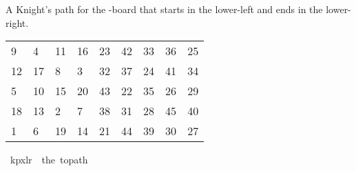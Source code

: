 \begin{isabellebody}
\begin{isamarkuptext}%
A Knight's path for the -board that starts in the lower-left and ends in the lower-right.
  \begin{table}[H]
    \begin{tabular}{lllllllll}
       9 &  4 & 11 & 16 & 23 & 42 & 33 & 36 & 25 \\
      12 & 17 &  8 &  3 & 32 & 37 & 24 & 41 & 34 \\
       5 & 10 & 15 & 20 & 43 & 22 & 35 & 26 & 29 \\
      18 & 13 &  2 &  7 & 38 & 31 & 28 & 45 & 40 \\
       1 &  6 & 19 & 14 & 21 & 44 & 39 & 30 & 27
    \end{tabular}
  \end{table}%
\end{isamarkuptext}\isamarkuptrue%
\isamarkupfalse%
\ {\isachardoublequoteopen}kp{}x{}lr\ {\isasymequiv}\ the\ {\isacharparenleft}{\kern0pt}to{\isacharunderscore}{\kern0pt}path\ \isanewline
\ \ {\isacharbrackleft}{\kern0pt}{\isacharbrackleft}{\kern0pt}{}{\isacharcomma}{\kern0pt}{}{\isacharcomma}{\kern0pt}{}{}{\isacharcomma}{\kern0pt}{}{}{\isacharcomma}{\kern0pt}{}{}{\isacharcomma}{\kern0pt}{}{}{\isacharcomma}{\kern0pt}{}{}{\isacharcomma}{\kern0pt}{}{}{\isacharcomma}{\kern0pt}{}{}{\isacharbrackright}{\kern0pt}{\isacharcomma}{\kern0pt}\isanewline
\ \ {\isacharbrackleft}{\kern0pt}{}{}{\isacharcomma}{\kern0pt}{}{}{\isacharcomma}{\kern0pt}{}{\isacharcomma}{\kern0pt}{}{\isacharcomma}{\kern0pt}{}{}{\isacharcomma}{\kern0pt}{}{}{\isacharcomma}{\kern0pt}{}{}{\isacharcomma}{\kern0pt}{}{}{\isacharcomma}{\kern0pt}{}{}{\isacharbrackright}{\kern0pt}{\isacharcomma}{\kern0pt}\isanewline
\ \ {\isacharbrackleft}{\kern0pt}{}{\isacharcomma}{\kern0pt}{}{}{\isacharcomma}{\kern0pt}{}{}{\isacharcomma}{\kern0pt}{}{}{\isacharcomma}{\kern0pt}{}{}{\isacharcomma}{\kern0pt}{}{}{\isacharcomma}{\kern0pt}{}{}{\isacharcomma}{\kern0pt}{}{}{\isacharcomma}{\kern0pt}{}{}{\isacharbrackright}{\kern0pt}{\isacharcomma}{\kern0pt}\isanewline

\end{isabellebody}
